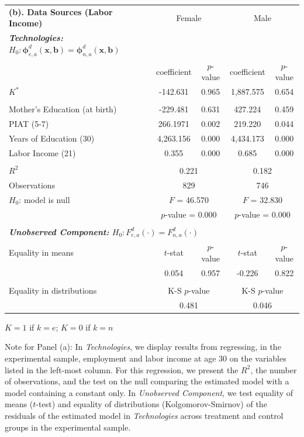 \begin{table}[!htpb]
\begin{threeparttable}
\begin{tabular}{lcccc}
 \multicolumn{1}{l}{\textbf{(b). Data Sources (Labor Income)}} & \multicolumn{2}{c}{Female} &   \multicolumn{2}{c}{Male} \\
 \textbf{\textit{Technologies:} $H_0: \bm{\phi}_{e,a}^d \left( \bm{x}, \bm{b} \right) = \bm{\phi}_{n,a}^d \left( \bm{x}, \bm{b} \right)$}      \\
       			      & coefficient & $p$-value & coefficient & $p$-value \\
$K^*$ & -142.631 & 0.965 & 1,887.575 & 0.654 \\ \\
Mother's Education (at birth) & -229.481 & 0.631 & 427.224 & 0.459 \\
PIAT (5-7) & 266.1971 & 0.002 & 219.220 & 0.044 \\
Years of Education (30) & 4,263.156 & 0.000 & 4,434.173 & 0.000 \\
Labor Income (21) & 0.355 & 0.000 & 0.685 & 0.000 \\ \\
$R^2$ & \multicolumn{2}{c}{0.221}  & \multicolumn{2}{c}{0.182}  \\
Observations & \multicolumn{2}{c}{829} & \multicolumn{2}{c}{746} \\
$H_0$: model is null & \multicolumn{2}{c}{$F$ = 46.570} & \multicolumn{2}{c}{$F$ = 32.830} \\
& \multicolumn{2}{c}{$p$-value = 0.000} & \multicolumn{2}{c}{$p$-value = 0.000} \\ \\
 \multicolumn{5}{l}{\textbf{\textit{Unobserved Component:} $H_0:  F_{e,a}^d \left( \cdot \right) =  F_{n,a}^d \left( \cdot \right)$}} \\
Equality in means & $t$-stat & $p$-value & $t$-stat & $p$-value \\
 & 0.054  & 0.957 & -0.226 & 0.822   \\ \\
Equality in distributions & \multicolumn{2}{c}{K-S $p$-value} &  \multicolumn{2}{c}{K-S $p$-value}  \\
                                      & \multicolumn{2}{c}{0.481} &  \multicolumn{2}{c}{0.046}  \\ \bottomrule
\end{tabular}
\begin{tablenotes}
\footnotesize
\item * $K = 1$ if $k = e$; $K = 0$ if $k = n$\\
\item Note for Panel (a): In \textit{Technologies}, we display results from regressing, in the experimental sample, employment and labor income at age 30 on the variables listed in the left-most column. For this regression, we present the $R^2$, the number of observations, and the test on the null comparing the estimated model with a model containing a constant only. In \textit{Unobserved Component}, we test equality of means ($t$-test) and equality of distributions (Kolgomorov-Smirnov) of the residuals of the estimated model in \textit{Technologies} across treatment and control groups in the experimental sample. \\

\end{tablenotes}
\end{threeparttable}
\end{table}
